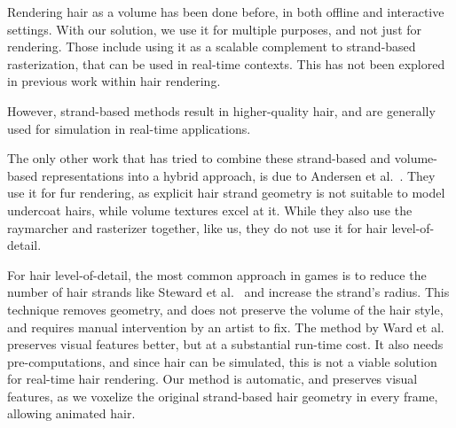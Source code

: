 \documentclass{egpubl}
\begin{document}


Rendering hair as a volume has been done before, in both offline \cite{petrovic2005volumetric, moon2008efficient, xing2015efficient} and interactive \cite{ren2010interactive, xing2012real} settings. With our solution, we use it for multiple purposes, and not just for rendering. Those include using it as a scalable complement to strand-based rasterization, that can be used in real-time contexts. This has not been explored in previous work within hair rendering.

However, strand-based methods result in higher-quality hair, and are generally used for simulation \cite{han2014hair} in real-time applications.


The only other work that has tried to combine these strand-based and volume-based representations into a hybrid approach, is due to Andersen et al.~\cite{andersen2016hybrid}. They use it for fur rendering, as explicit hair strand geometry is not suitable to model undercoat hairs, while volume textures excel at it. While they also use the raymarcher and rasterizer together, like us, they do not use it for hair level-of-detail.


For hair level-of-detail, the most common approach in games is to reduce the number of hair strands like Steward et al.~\cite{steward2015augmented} and increase the strand's radius. This technique removes geometry, and does not preserve the volume of the hair style, and requires manual intervention by an artist to fix. The method by Ward et al.~\cite{ward2003modeling} preserves visual features better, but at a substantial run-time cost. It also needs pre-computations, and since hair can be simulated, this is not a viable solution for real-time hair rendering. Our method is automatic, and preserves visual features, as we voxelize the original strand-based hair geometry in every frame, allowing animated hair.

\end{document}
